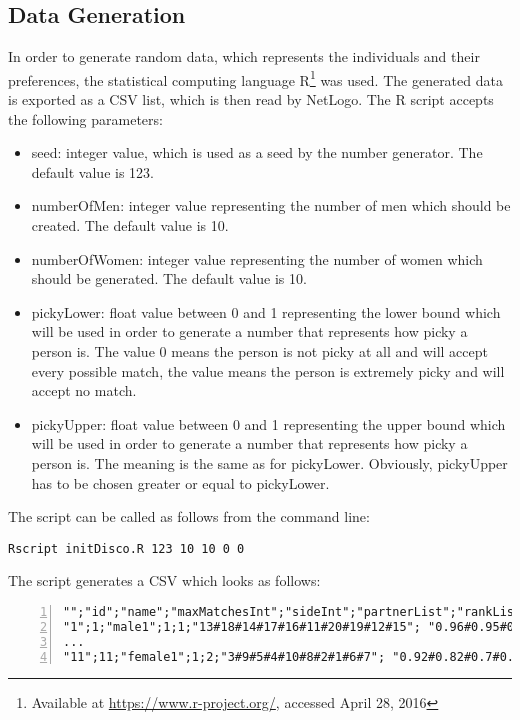 \clearpage
\subsection{Data Generation}
In order to generate random data, which represents the individuals and their preferences, the statistical computing language R\footnote{Available at \url{https://www.r-project.org/}, accessed April 28, 2016} was used. 
The generated data is exported as a CSV list, which is then read by NetLogo. 
The R script accepts the following parameters:
\begin{itemize}
	\item seed: integer value, which is used as a seed by the number generator. The default value is 123.
	\item numberOfMen: integer value representing the number of men which should be created. The default value is 10.
	\item numberOfWomen: integer value representing the number of women which should be generated. The default value is 10.
	\item pickyLower: float value between 0 and 1 representing the lower bound which will be used in order to generate a number that represents how picky a person is. The value 0 means the person is not picky at all and will accept every possible match, the value means the person is extremely picky and will accept no match.
	\item pickyUpper: float value between 0 and 1 representing the upper bound which will be used in order to generate a number that represents how picky a person is. The meaning is the same as for pickyLower. Obviously, pickyUpper has to be chosen greater or equal to pickyLower.
\end{itemize}

The script can be called as follows from the command line: 
\begin{verbatim}
Rscript initDisco.R 123 10 10 0 0
\end{verbatim}

The script generates a CSV which looks as follows:
\begin{lstlisting}[numbers=left, breaklines=true] 
"";"id";"name";"maxMatchesInt";"sideInt";"partnerList";"rankList"
"1";1;"male1";1;1;"13#18#14#17#16#11#20#19#12#15"; "0.96#0.95#0.9#0.68#0.57#0.45#0.33#0.25#0.1#0.04"
...
"11";11;"female1";1;2;"3#9#5#4#10#8#2#1#6#7"; "0.92#0.82#0.7#0.67#0.48#0.41#0.35#0.25#0.22#0.05"
\end{lstlisting}

\clearpage
